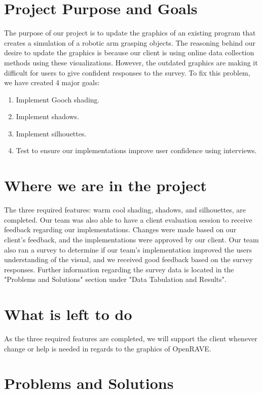 \documentclass[10pt,journal,compsoc,draftclsnofoot]{IEEEtran}
\begin{document}
\begin{flushleft}

\section{Project Purpose and Goals}
The purpose of our project is to update the graphics of an existing program that creates a simulation of a robotic arm grasping objects.
The reasoning behind our desire to update the graphics is because our client is using online data collection methods using these visualizations.
However, the outdated graphics are making it difficult for users to give confident responses to the survey.
To fix this problem, we have created 4 major goals:
\begin{enumerate}
\item Implement Gooch shading.
\item Implement shadows.
\item Implement silhouettes.
\item Test to ensure our implementations improve user confidence using interviews.
\end{enumerate}

\section{Where we are in the project}
The three required features: warm cool shading, shadows, and silhouettes, are completed.
Our team was also able to have a client evaluation session to receive feedback regarding our implementations.
Changes were made based on our client's feedback, and the implementations were approved by our client.
Our team also ran a survey to determine if our team's implementation improved the users understanding of the visual, and we received good feedback based on the survey responses.
Further information regarding the survey data is located in the "Problems and Solutions" section under "Data Tabulation and Results".

\section{What is left to do}
As the three required features are completed, we will support the client whenever change or help is needed in regards to the graphics of OpenRAVE.

\newpage

\section{Problems and Solutions}

\end{flushleft}
\end{document}
